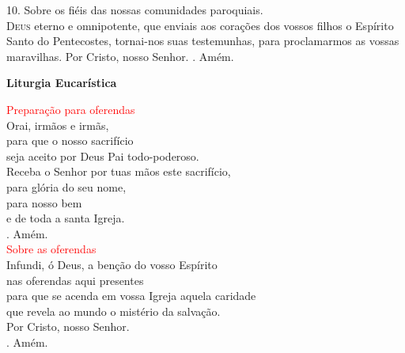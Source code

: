 \documentclass{book}
\begin{document}
\begin{flushleft}
    \vspace{0.1cm}
    \newline
    {\color{red} 10.} Sobre os fiéis das nossas comunidades paroquiais.
    \vspace{0.1cm} \\
    \lettrine[findent=2pt]{\color{red}D}{eus} eterno e omnipotente,
    \newline
    que enviais aos corações dos vossos filhos
    \newline
    o Espírito Santo do Pentecostes,
    \newline
    tornai-nos suas testemunhas,
    \newline
    para proclamarmos as vossas maravilhas.
    \newline
    Por Cristo, nosso Senhor.
    \newline
    {\color{red} \Rbar.} Amém.

\end{flushleft}

\begin{center}

    \textbf{Liturgia Eucarística}

\end{center}

\begin{flushleft}
    \textcolor{red}{Preparação para oferendas}
    \vspace{0.2cm} \\
    Orai, irmãos e irmãs, \\
    para que o nosso sacrifício \\
    seja aceito por Deus Pai todo-poderoso.
    \vspace{0.1cm} \\
    Receba o Senhor por tuas mãos este sacrifício, \\
    para glória do seu nome, \\
    para nosso bem \\
    e de toda a santa Igreja.
    \vspace{0.1cm} \\
    {\color{red} \Rbar.} Amém.
    \vspace{0.2cm} \\
    \textcolor{red}{Sobre as oferendas}
    \vspace{0.2cm} \\
    Infundi, ó Deus, a benção do vosso Espírito \\
    nas oferendas aqui presentes \\
    para que se acenda em vossa Igreja aquela caridade \\
    que revela ao mundo o mistério da salvação. \\
    Por Cristo, nosso Senhor. \\
    {\color{red} \Rbar.} Amém.

\end{flushleft}
\end{document}
